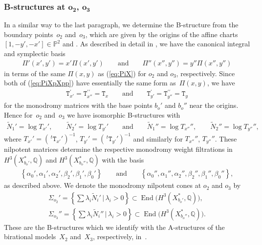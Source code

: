 \documentclass[10pt,a4paper]{amsart}
\numberwithin{equation}{section}
\begin{document}
\subsubsection[B-structures at $o_2$, $o_3$]{B-structures at $\boldsymbol{o_2}$, $\boldsymbol{o_3}$} \label{para: B-str-23} In a similar way to the last paragraph, we determine the B-structure from the boundary points~$o_{2}$ and~$o_{3}$, which are given by the origins of the affine charts $[1,-y',-x']\in\mathbb{P}^{2}$ and . As described in detail in \cite[Section~6.3.1]{HTcmp}, we have the canonical integral and symplectic basis
\begin{gather}
\Pi'(x',y')=x'\Pi(x',y')\qquad \text{and} \qquad \Pi''(x'',y'')=y''\Pi(x'',y'')\label{eq:PiXpXpp}
\end{gather}
in terms of the same $\Pi(x,y)$ as (\ref{eq:PiX}) for $o_{2}$ and $o_{3}$, respectively. Since both of (\ref{eq:PiXpXpp}) have essentially the same form as~$\Pi(x,y)$, we have
\begin{gather}
\mathtt{T}_{x'}^{\prime}=\mathtt{T}_{x''}^{\prime\prime}=\mathtt{T}_{x}\qquad \text{and} \qquad \mathtt{T}_{y'}^{\prime}=\mathtt{T}_{y''}^{\prime\prime}=\mathtt{T}_{y}\label{eq:TxTyForAll}
\end{gather}
for the monodromy matrices with the base points $b_{o}'$ and $b_{o}''$ near the origins. Hence for~$o_{2}$ and~$o_{3}$ we have isomorphic
B-structures with
\begin{gather*}
\tilde{N}_{1}'=\log T_{x'}',\qquad \tilde{N}_{2}'=\log T_{y'}'\qquad \text{and} \qquad \tilde{N}_{1}''=\log T_{x''}'',\qquad \tilde{N}_{2}''=\log T_{y''}'',
\end{gather*}
where $T_{x'}'=(\,^{t}\mathtt{T}_{x'}')^{-1}$, $T_{y'}'=(\,^{t}\mathtt{T}_{y'}')^{-1}$ and similarly for $T_{x''}''$, $T_{y''}''$. These nilpotent matrices determine the respective monodromy weight filtrations in $H^{3}(X_{b_{o}'}^{*},\mathbb{Q})$ and $H^{3}(X_{b_{o}''}^{*},\mathbb{Q})$ with the basis
\begin{gather}
\left\{ \alpha_{0}',\alpha_{1}',\alpha_{2}',\beta_{2}',\beta_{1}',\beta_{0}'\right\} \qquad \text{and} \qquad \left\{ \alpha_{0}'',\alpha_{1}'',\alpha_{2}'',\beta_{2}'',\beta_{1}'',\beta_{0}''\right\} ,\label{eq:base-B23}
\end{gather}
as described above. We denote the monodromy nilpotent cones at $o_{2}$ and $o_{3}$ by
\begin{gather}
\Sigma_{o_{2}}'=\left\{ \sum\lambda_{i}\tilde{N}_{i}'\,|\,\lambda_{i}>0\right\} \subset\operatorname{End}\big(H^{3}(X_{b_{o}'}^{*},\mathbb{Q})\big),\nonumber\\
\Sigma_{o_{3}}''=\left\{ \sum\lambda_{i}\tilde{N}_{i}''\,|\,\lambda_{i}>0\right\} \subset\operatorname{End}\big(H^{3}(X_{b_{o}''}^{*},\mathbb{Q})\big).
\label{eq:Cones23}
\end{gather}
These are the B-structures which we identify with the A-structures of the birational models~$X_{2}$ and~$X_{3}$, respectively, in~\cite{HTcmp}.
\end{document}
